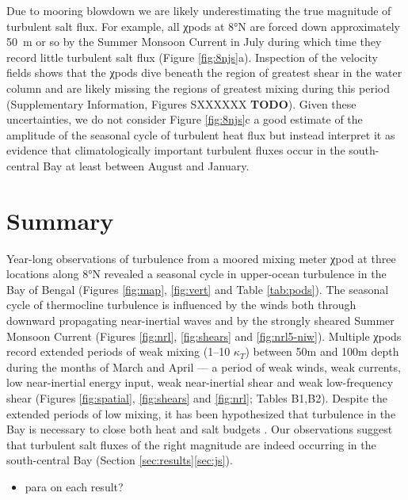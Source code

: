 \documentclass[twocol]{ametsoc}
\begin{document}
Due to mooring blowdown we are likely underestimating the true magnitude of turbulent salt flux.
For example, all χpods at 8°N are forced down approximately \SI{50}{m} or so by the Summer Monsoon Current in July during which time they record little turbulent salt flux (Figure \ref{fig:8njs}a).
Inspection of the velocity fields shows that the χpods dive beneath the region of greatest shear in the water column and are likely missing the regions of greatest mixing during this period (Supplementary Information, Figures SXXXXXX \textbf{TODO}).
Given these uncertainties, we do not consider Figure \ref{fig:8njs}c a good estimate of the amplitude of the seasonal cycle of turbulent heat flux but instead interpret it as evidence that climatologically important turbulent fluxes occur in the south-central Bay at least between August and January.

\section{Summary}
\label{sec:org3230bcc}

Year-long observations of turbulence from a moored mixing meter χpod at three locations along 8°N revealed a seasonal cycle in upper-ocean turbulence in the Bay of Bengal (Figures \ref{fig:map}, \ref{fig:vert} and Table \ref{tab:pods}).
The seasonal cycle of thermocline turbulence is influenced by the winds both through downward propagating near-inertial waves and by the strongly sheared Summer Monsoon Current (Figures \ref{fig:nrl}, \ref{fig:shears} and \ref{fig:nrl5-niw}).
Multiple χpods record extended periods of weak mixing (1--10 \(κ_T\)) between 50m and 100m depth during the months of March and April --- a period of weak winds, weak currents, low near-inertial energy input, weak near-inertial shear and weak low-frequency shear (Figures \ref{fig:spatial}, \ref{fig:shears} and \ref{fig:nrl}; Tables B1,B2).
Despite the extended periods of low mixing, it has been hypothesized that turbulence in the Bay is necessary to close both heat and salt budgets \citep{Shenoi2002,Vinayachandran2013,Wilson2016a}.
Our observations suggest that turbulent salt fluxes of the right magnitude are indeed occurring in the south-central Bay (Section \ref{sec:results}\ref{sec:js}).

\begin{itemize}
\item para on each result?
\end{itemize}
\end{document}
